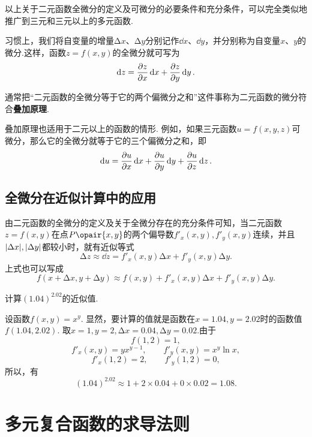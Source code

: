 以上关于二元函数全微分的定义及可微分的必要条件和充分条件，可以完全类似地推广到三元和三元以上的多元函数.

习惯上，我们将自变量的增量\(\increment x\)、\(\increment y\)分别记作\(\dd{x}\)、\(\dd{y}\)，并分别称为自变量\(x\)、\(y\)的微分.这样，函数\(z=f(x,y)\)的全微分就可写为\[
\dd{z}=\pdv{z}{x}\dd{x}+\pdv{z}{y}\dd{y}.
\]

通常把“二元函数的全微分等于它的两个偏微分之和”这件事称为二元函数的微分符合\textbf{叠加原理}.

叠加原理也适用于二元以上的函数的情形.
例如，如果三元函数\(u = f(x,y,z)\)可微分，那么它的全微分就等于它的三个偏微分之和，即\[
\dd{u} = \pdv{u}{x} \dd{x} + \pdv{u}{y} \dd{y} + \pdv{u}{z} \dd{z}.
\]

\subsection{全微分在近似计算中的应用}
由二元函数的全微分的定义及关于全微分存在的充分条件可知，当二元函数\(z = f(x,y)\)在点\(P\opair{x,y}\)的两个偏导数\(f'_x(x,y),f'_y(x,y)\)连续，并且\(\abs{\Delta x},\abs{\Delta y}\)都较小时，就有近似等式\[
\increment z \approx \dd{z} = f'_x(x,y) \increment x + f'_y(x,y) \increment y.
\]上式也可以写成\[
f(x+\increment x,y+\increment y) \approx f(x,y) + f'_x(x,y) \increment x + f'_y(x,y) \increment y.
\]

\begin{example}
计算\((1.04)^{2.02}\)的近似值.
\begin{solution}
设函数\(f(x,y) = x^y\).
显然，要计算的值就是函数在\(x=1.04,y=2.02\)时的函数值\(f(1.04,2.02)\).
取\(x=1,y=2,\increment x=0.04,\increment y=0.02\).由于\[
f(1,2)=1,
\]\[
f'_x(x,y) = y x^{y-1}, \qquad f'_y(x,y) = x^y \ln x,
\]\[
f'_x(1,2) = 2, \qquad f'_y(1,2) = 0,
\]所以，有\[
(1.04)^{2.02} \approx 1 + 2 \times 0.04 + 0 \times 0.02 = 1.08.
\]
\end{solution}
\end{example}

\section{多元复合函数的求导法则}
